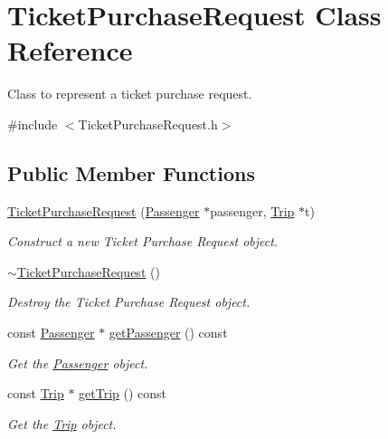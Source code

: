 \hypertarget{classTicketPurchaseRequest}{}\section{Ticket\+Purchase\+Request Class Reference}
\label{classTicketPurchaseRequest}


Class to represent a ticket purchase request.  




{\ttfamily \#include $<$Ticket\+Purchase\+Request.\+h$>$}

\subsection*{Public Member Functions}
\begin{DoxyCompactItemize}
\item 
\mbox{\hyperlink{classTicketPurchaseRequest_aaa01be19b8a8ef88428f4d1dc3a3c63c}{Ticket\+Purchase\+Request}} (\mbox{\hyperlink{classPassenger}{Passenger}} $\ast$passenger, \mbox{\hyperlink{classTrip}{Trip}} $\ast$t)
\begin{DoxyCompactList}\small\item\em Construct a new Ticket Purchase Request object. \end{DoxyCompactList}\item 
\mbox{\hyperlink{classTicketPurchaseRequest_afdd1e6ed2929ecb81dbefd1aecf22326}{$\sim$\+Ticket\+Purchase\+Request}} ()
\begin{DoxyCompactList}\small\item\em Destroy the Ticket Purchase Request object. \end{DoxyCompactList}\item 
const \mbox{\hyperlink{classPassenger}{Passenger}} $\ast$ \mbox{\hyperlink{classTicketPurchaseRequest_a08428a7617aa26c16702420e61ce0312}{get\+Passenger}} () const
\begin{DoxyCompactList}\small\item\em Get the \mbox{\hyperlink{classPassenger}{Passenger}} object. \end{DoxyCompactList}\item 
const \mbox{\hyperlink{classTrip}{Trip}} $\ast$ \mbox{\hyperlink{classTicketPurchaseRequest_a7ae48dcccbcddb298fae1bd74048570b}{get\+Trip}} () const
\begin{DoxyCompactList}\small\item\em Get the \mbox{\hyperlink{classTrip}{Trip}} object. \end{DoxyCompactList}\item 

\end{DoxyCompactItemize}
